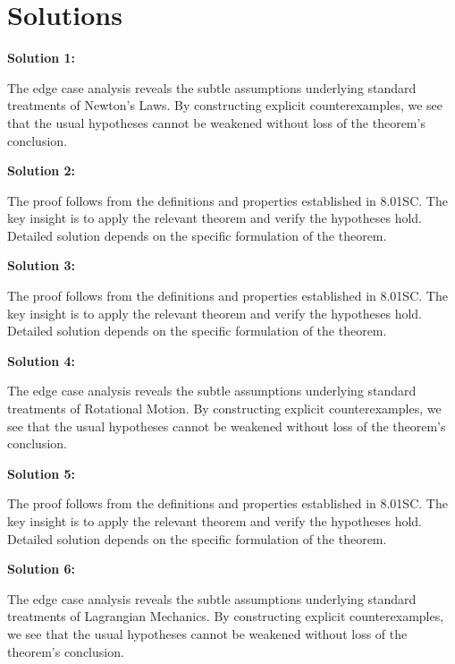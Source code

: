 \documentclass[12pt,a4paper]{exam}
\begin{document}
\newpage
\section*{Solutions}

\textbf{Solution 1:}

The edge case analysis reveals the subtle assumptions underlying standard treatments of Newton's Laws. By constructing explicit counterexamples, we see that the usual hypotheses cannot be weakened without loss of the theorem's conclusion.

\vspace{0.5cm}

\textbf{Solution 2:}

The proof follows from the definitions and properties established in 8.01SC. The key insight is to apply the relevant theorem and verify the hypotheses hold. Detailed solution depends on the specific formulation of the theorem.

\vspace{0.5cm}

\textbf{Solution 3:}

The proof follows from the definitions and properties established in 8.01SC. The key insight is to apply the relevant theorem and verify the hypotheses hold. Detailed solution depends on the specific formulation of the theorem.

\vspace{0.5cm}

\textbf{Solution 4:}

The edge case analysis reveals the subtle assumptions underlying standard treatments of Rotational Motion. By constructing explicit counterexamples, we see that the usual hypotheses cannot be weakened without loss of the theorem's conclusion.

\vspace{0.5cm}

\textbf{Solution 5:}

The proof follows from the definitions and properties established in 8.01SC. The key insight is to apply the relevant theorem and verify the hypotheses hold. Detailed solution depends on the specific formulation of the theorem.

\vspace{0.5cm}

\textbf{Solution 6:}

The edge case analysis reveals the subtle assumptions underlying standard treatments of Lagrangian Mechanics. By constructing explicit counterexamples, we see that the usual hypotheses cannot be weakened without loss of the theorem's conclusion.
\end{document}

